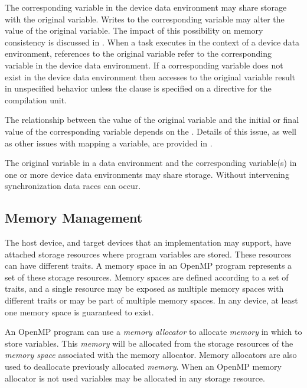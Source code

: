 The corresponding variable in the device data environment may share 
storage with the original variable. Writes to the corresponding 
variable may alter the value of the original variable. The impact 
of this possibility on memory consistency is discussed in 
. When a task executes 
in the context of a device data environment, references to the 
original variable refer to the corresponding variable in the device 
data environment. If a corresponding variable does not exist in the 
device data environment then accesses to the original variable result 
in unspecified behavior unless the  
clause is specified on a  directive for 
the compilation unit.

The relationship between the value of the original variable and the 
initial or final value of the corresponding variable depends on the 
. Details of this issue, as well as other issues with 
mapping a variable, are provided in .

The original variable in a data environment and the corresponding 
variable(s) in one or more device data environments may share storage. 
Without intervening synchronization data races can occur.

\subsection{Memory Management}
The host device, and target devices that an implementation may support, 
have attached storage resources where program variables are stored. 
These resources can have different traits. A memory space in an OpenMP 
program represents a set of these storage resources. Memory spaces are 
defined according to a set of traits, and a single resource may be exposed 
as multiple memory spaces with different traits or may be part of multiple 
memory spaces. In any device, at least one memory space is guaranteed to exist.

An OpenMP program can use a \emph{memory allocator} to allocate \emph{memory} 
in which to store variables. This \emph{memory} will be allocated from the 
storage resources of the \emph{memory space} associated with the memory 
allocator. Memory allocators are also used to deallocate previously allocated
\emph{memory}. When an OpenMP memory allocator is not used variables may be 
allocated in any storage resource.



